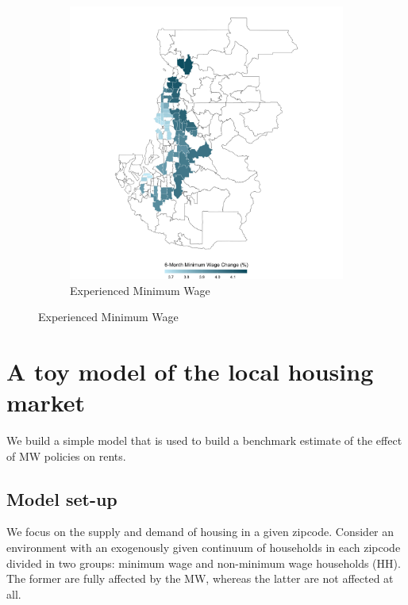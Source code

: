 \begin{figure}
\begin{subfigure}[b]{.8\textwidth}
		\includegraphics[width = \textwidth]{../../analysis/descriptive_maps/output/Seattle_expmw_msa.png}
		\caption{Experienced Minimum Wage}
	\end{subfigure}
\end{figure}
\clearpage
\section{A toy model of the local housing market}\label{sec:model}

We build a simple model that is used to build a benchmark estimate of the effect of MW
policies on rents.

\subsection{Model set-up}

We focus on the supply and demand of housing in a given zipcode. Consider an environment with 
an exogenously given continuum of households in each zipcode divided in two groups: minimum wage 
and non-minimum wage households (HH). The former are fully affected by the MW, whereas the latter 
are not affected at all.

